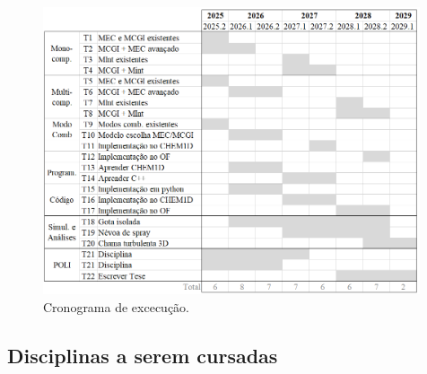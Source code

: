 \begin{figure}[H]
    \centering
    \caption{Cronograma de excecução.}
    \includegraphics[width=0.99\textwidth]{30_images/cronograma-2.png}
\end{figure}

\subsection{Disciplinas a serem cursadas} \label{sec:disciplinas}


